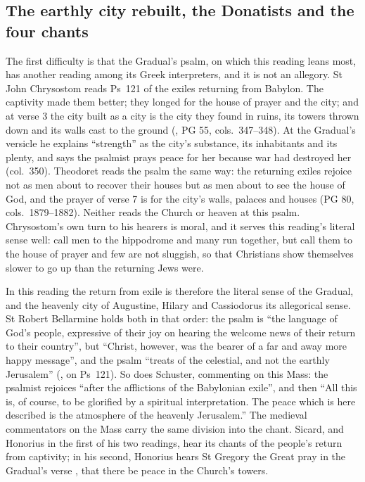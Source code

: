 \subsection{The earthly city rebuilt, the Donatists and the four chants}

The first difficulty is that the Gradual's psalm, on which this reading leans
most, has another reading among its Greek interpreters, and it is not an
allegory. St John Chrysostom
reads Ps~121 of the exiles returning from Babylon. The captivity made them
better; they longed for the house of prayer and the city; and at verse 3 the
city built as a city is the city they found in ruins, its towers thrown down
and its walls cast to the ground (, PG 55,
cols.~347--348). At the Gradual's versicle he explains ``strength'' as the
city's substance, its inhabitants and its plenty, and says the psalmist prays
peace for her because war had destroyed her (col.~350). Theodoret reads the
psalm the same way: the returning exiles rejoice not as men about to recover
their houses but as men about to see the house of God, and the prayer of verse
7 is for the city's walls, palaces and houses (PG 80, cols.~1879--1882).
Neither reads the Church or heaven at this psalm. Chrysostom's own turn to his
hearers is moral, and it serves this reading's literal sense well: call men to
the hippodrome and many run together, but call them to the house of prayer and
few are not sluggish, so that Christians show themselves slower to go up than
the returning Jews were.

In this reading the return from exile is therefore the literal sense of the
Gradual, and the heavenly city of Augustine, Hilary and Cassiodorus its
allegorical sense. St Robert Bellarmine holds both in that order: the psalm is
``the language of God's people, expressive of their joy on hearing the welcome
news of their return to their country'', but ``Christ, however, was the bearer
of a far and away more happy message'', and the psalm ``treats of the celestial,
and not the earthly Jerusalem'' (, on
Ps~121). So does Schuster, commenting on this Mass: the psalmist rejoices
``after the afflictions of the Babylonian exile'', and then ``All this is, of
course, to be glorified by a spiritual interpretation. The peace which is here
described is the atmosphere of the heavenly Jerusalem.'' The medieval
commentators on the Mass carry the same division into the chant. Sicard, and
Honorius in the first of his two readings, hear its chants of the people's
return from captivity; in his second, Honorius hears St Gregory the Great pray
in the Gradual's verse , that there be
peace in the Church's towers.

